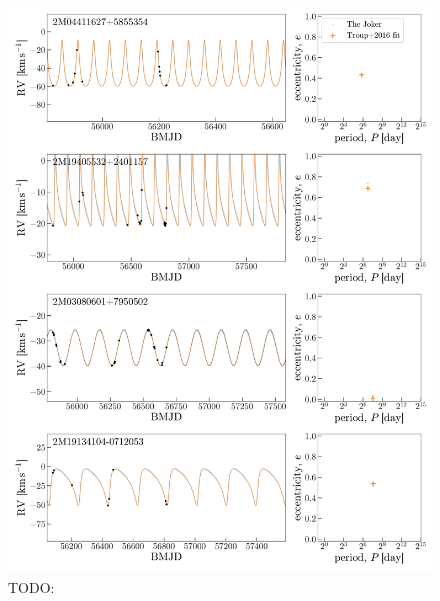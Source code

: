 \documentclass[modern, letterpaper]{aastex62}
\begin{document}
\begin{figure}[h]
\begin{center}
\includegraphics[width=\textwidth]{unimodal.pdf}
\end{center}
\caption{%
TODO:
\label{fig:troup-unimodal}
}
\end{figure}
\end{document}
